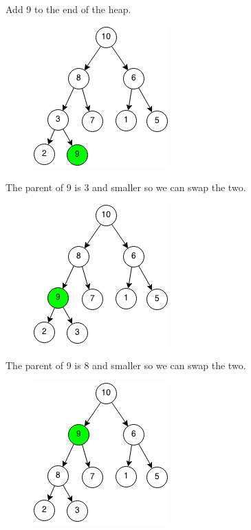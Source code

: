 \documentclass[11pt,oneside]{book}
\makeatletter
\def\maxwidth#1{\ifdim\Gin@nat@width>#1 #1\else\Gin@nat@width\fi}
\makeatother
\begin{document}
Add 9 to the end of the heap.

\vspace{5px}\begin{figure}[H]\centering
        \includegraphics[width=0.66\maxwidth{\textwidth}]{maxheappush.png}
        \end{figure}

The parent of 9 is 3 and smaller so we can swap the two.

\vspace{5px}\begin{figure}[H]\centering
        \includegraphics[width=0.66\maxwidth{\textwidth}]{maxheappush2.png}
        \end{figure}

The parent of 9 is 8 and smaller so we can swap the two.

\vspace{5px}\begin{figure}[H]\centering
        \includegraphics[width=0.66\maxwidth{\textwidth}]{maxheappush3.png}
        \end{figure}
\end{document}
